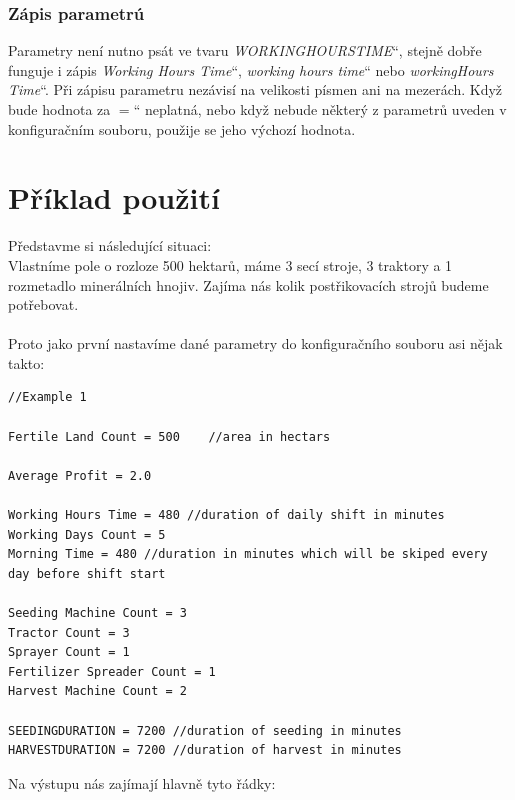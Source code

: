 \documentclass[11pt,a4paper,titlepage]{article}
\newcommand{\ceskeuvozovky}[1]{\quotedblbase#1\textquotedblleft}
\begin{document}
\subsubsection{Zápis parametrú}
Parametry není nutno psát ve tvaru \ceskeuvozovky{\emph{WORKINGHOURSTIME}}, stejně dobře funguje i zápis \ceskeuvozovky{\emph{Working Hours Time}}, \ceskeuvozovky{\emph{working hours time}} nebo \ceskeuvozovky{\emph{workingHours Time}}. Při zápisu parametru nezávisí na velikosti písmen ani na mezerách. Když bude hodnota za \ceskeuvozovky{$=$} neplatná, nebo když nebude některý z parametrů uveden v konfiguračním souboru, použije se jeho výchozí hodnota.

\section{Příklad použití}

Představme si následující situaci: \\
Vlastníme pole o rozloze 500 hektarů, máme 3 secí stroje, 3 traktory a 1 rozmetadlo minerálních hnojiv. Zajíma nás kolik postřikovacích strojů budeme potřebovat. \\ \\

Proto jako první nastavíme dané parametry do konfiguračního souboru asi nějak takto: \\

\begin{lstlisting}
//Example 1

Fertile Land Count = 500    //area in hectars

Average Profit = 2.0

Working Hours Time = 480 //duration of daily shift in minutes
Working Days Count = 5
Morning Time = 480 //duration in minutes which will be skiped every day before shift start

Seeding Machine Count = 3
Tractor Count = 3
Sprayer Count = 1
Fertilizer Spreader Count = 1
Harvest Machine Count = 2

SEEDINGDURATION = 7200 //duration of seeding in minutes
HARVESTDURATION = 7200 //duration of harvest in minutes
\end{lstlisting}
\vspace{45px}
Na výstupu nás zajímají hlavně tyto řádky: \\ \\
\end{document}
